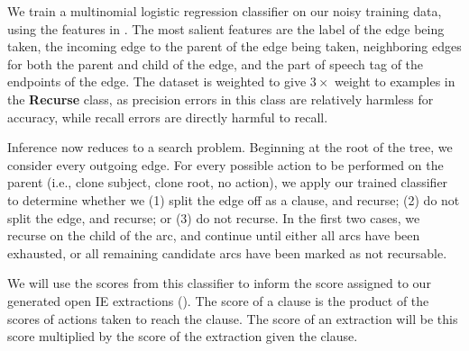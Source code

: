 We train a multinomial logistic regression classifier on our noisy
  training data, using the features in .
The most salient features are the label of the edge being taken, the
  incoming edge to the parent of the edge being taken, neighboring edges
  for both the parent and child of the edge, and the part of speech tag of
  the endpoints of the edge.
The dataset is weighted to give $3\times$ weight to examples in the \textbf{Recurse}
  class, as precision errors in this class are relatively harmless for accuracy,
  while recall errors are directly harmful to recall.


Inference now reduces to a search problem.
Beginning at the root of the tree, we consider every outgoing edge.
  For every possible action to be performed on the parent (i.e., clone subject,
  clone root, no action), we apply our trained classifier to determine
  whether we 
  (1) split the edge off as a clause, and recurse;
  (2) do not split the edge, and recurse; or 
  (3) do not recurse.
In the first two cases, we recurse on the child of the arc, and continue until
  either all arcs have been exhausted, or all remaining candidate arcs
  have been marked as not recursable.

We will use the scores from this classifier to inform the score assigned to
  our generated open IE extractions ().
The score of a clause is the product of the scores of actions taken to reach
  the clause.
The score of an extraction will be this score multiplied by the score
  of the extraction given the clause.
